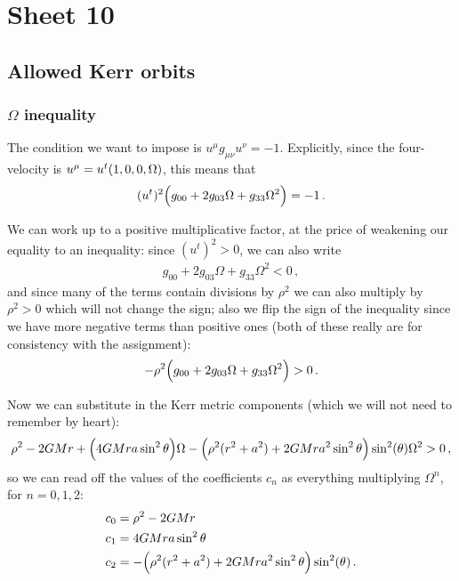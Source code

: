 \documentclass[main.tex]{subfiles}
\begin{document}
\section{Sheet 10}

\subsection{Allowed Kerr orbits}

\subsubsection{\(\Omega \) inequality}

The condition we want to impose is \(u^{\mu } g_{\mu \nu } u^{\nu } = -1\). Explicitly, since the four-velocity is  \(u^{\mu } = u^{t} \qty(1, 0, 0, \Omega )\), this means that 
%
\begin{align}
  (u^{t})^2 \qty(g_{00} + 2 g_{03} \Omega + g_{33} \Omega^2 ) = -1
\,.
\end{align}

We can work up to a positive multiplicative factor, at the price of weakening our equality to an inequality: since \((u^{t})^2 > 0\), we can also write 
%
\begin{align}
  g_{00} + 2 g_{03} \Omega + g_{33} \Omega^2 < 0
\,,
\end{align}
%
and since many of the terms contain divisions by \(\rho^2\) we can also multiply by \(\rho^2>0\) which will not change the sign; also we flip the sign of the inequality since we have more negative terms than positive ones (both of these really are for consistency with the assignment):
%
\begin{align}
 - \rho^2 \qty(g_{00} + 2 g_{03} \Omega + g_{33} \Omega^2 ) > 0 
\,.
\end{align}

Now we can substitute in the Kerr metric components (which we will not need to remember by heart): 
%
\begin{align}
  \rho^2 - 2GMr 
  + \qty(4 GMra \sin^2\theta ) \Omega 
  - \qty(\rho^2 (r^2 + a^2 ) + 2GMra^2 \sin^2\theta ) \sin^2(\theta)  \Omega^2 > 0
\,,
\end{align}
%
so we can read off the values of the coefficients \(c_{n}\) as everything multiplying \(\Omega^{n}\), for \(n = 0, 1, 2\): 
%
\begin{subequations}
\begin{align}
    c_0 &= \rho^2 - 2GM r   \\
    c_1 &= 4 GMra \sin^2\theta   \\
    c_2 &= - \qty(\rho^2 (r^2 + a^2 ) + 2GMra^2 \sin^2\theta ) \sin^2(\theta)
\,.
\end{align}
\end{subequations}
\end{document}
